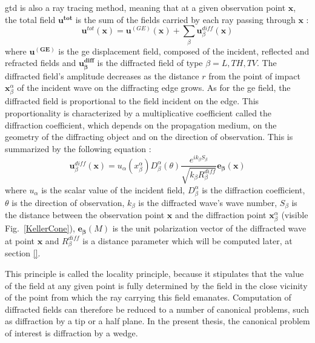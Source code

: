 \acrshort{gtd} is also a ray tracing method, meaning that at a given observation point $\mathbf{x}$, the total field $\mathbf{u^{tot}}$ is the sum of the fields carried by each ray passing through $\mathbf{x}$ :
\begin{equation}
    \mathbf{u}^{tot}(\mathbf{x})=\mathbf{u}^{(GE)}(\mathbf{x})+\sum_{\beta} \mathbf{u}^{diff}_{\beta}(\mathbf{x})
    \label{GTDtot}
\end{equation}
where $\mathbf{u^{(GE)}}$ is the \acrshort{ge} displacement field, composed of the incident, reflected and refracted fields and $\mathbf{u^{diff}_{\beta}}$ is the diffracted field of type $\beta=L,TH,TV$. The diffracted field's amplitude decreases as the distance $r$ from the point of impact $\mathbf{x}_{\beta}^{\alpha}$ of the incident wave on the diffracting edge grows. As for the \acrshort{ge} field, the diffracted field is proportional to the field incident on the edge. This proportionality is characterized by a multiplicative coefficient called the diffraction coefficient, which depends on the propagation medium, on the geometry of the diffracting object and on the direction of observation. This is summarized by the following equation :
\begin{equation}
    \mathbf{u}_{\beta}^{diff}(\mathbf{x})=u_{\alpha}(x_{\beta}^{\alpha})D_{\beta}^{\alpha}(\theta)\dfrac{e^{ik_{\beta}S_{\beta}}}{\sqrt{k_{\beta}R_{\beta}^{diff}}}\mathbf{e_{\beta}}(\mathbf{x})
\end{equation}
where $u_{\alpha}$ is the scalar value of the incident field, $D_{\beta}^{\alpha}$ is the diffraction coefficient, $\theta$ is the direction of observation, $k_{\beta}$ is the diffracted wave's wave number, $S_{\beta}$ is the distance between the observation point $\mathbf{x}$ and the diffraction point $\mathbf{x}_{\beta}^{\alpha}$ (visible Fig.~\ref{KellerCone}), $\mathbf{e_{\beta}}(M)$ is the unit polarization vector of the diffracted wave at point $\mathbf{x}$ and $R_{\beta}^{diff}$ is a distance parameter which will be computed later, at section \ref{}.

This principle is called the locality principle, because it stipulates that the value of the field at any given point is fully determined by the field in the close vicinity of the point from which the ray carrying this field emanates. Computation of diffracted fields can therefore be reduced to a number of canonical problems, such as diffraction by a tip or a half plane. In the present thesis, the canonical problem of interest is diffraction by a wedge.

